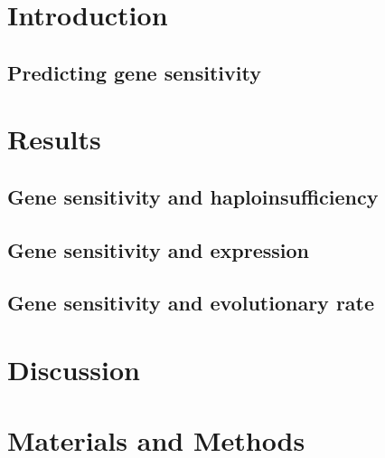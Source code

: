 \section{Introduction}

\subsection{Predicting gene sensitivity}

\section{Results}

\subsection{Gene sensitivity and haploinsufficiency}

\subsection{Gene sensitivity and expression}

\subsection{Gene sensitivity and evolutionary rate}

\section{Discussion}

\section{Materials and Methods}

